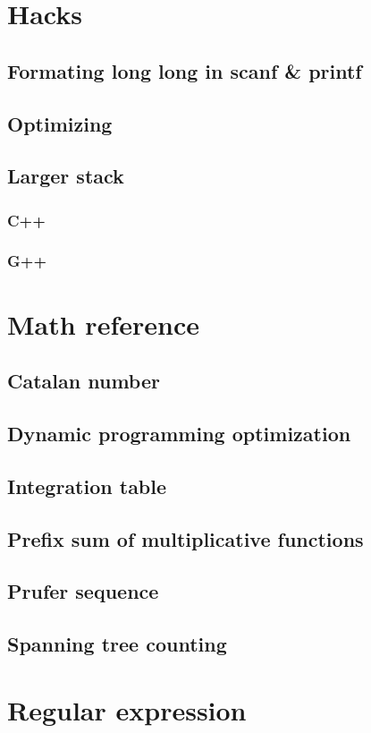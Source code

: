 \documentclass[UTF8,a4paper]{report}
\begin{document}
		\section{Hacks}
			\subsection{Formating long long in scanf \& printf}
				
			\subsection{Optimizing}
				
			\subsection{Larger stack}
				\subsubsection{C++}
					
				\subsubsection{G++}
					
		\section{Math reference}
			\subsection{Catalan number}
				
			\subsection{Dynamic programming optimization}
				
			\subsection{Integration table}
				
			\subsection{Prefix sum of multiplicative functions}
				
			\subsection{Prufer sequence}
				
			\subsection{Spanning tree counting}
				
		\section{Regular expression}
				
			
\end{document}
